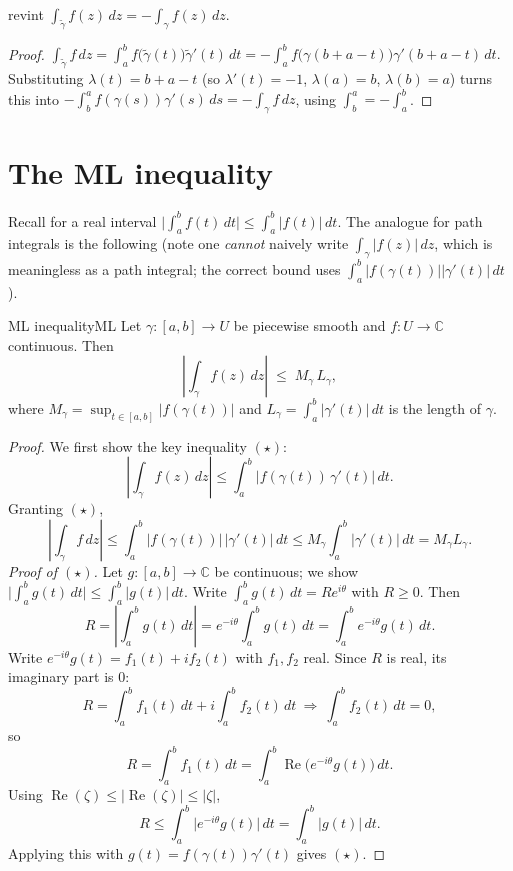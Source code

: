 \documentclass[11pt,openany]{report}
\newcommand{\C}{\mathbb{C}}
\renewcommand{\Re}{\operatorname{Re}}
\newcommand{\abs}[1]{\left\lvert #1 \right\rvert}
\begin{document}
\begin{propos}{}{revint}
$\displaystyle\int_{\widetilde\gamma}f(z)\,dz = -\int_{\gamma}f(z)\,dz.$
\end{propos}

\begin{proof}
$\displaystyle\int_{\widetilde\gamma}f\,dz=\int_a^b f\bigl(\widetilde\gamma(t)\bigr)\widetilde\gamma'(t)\,dt
=-\int_a^b f\bigl(\gamma(b+a-t)\bigr)\gamma'(b+a-t)\,dt.$ Substituting
$\lambda(t)=b+a-t$ (so $\lambda'(t)=-1$, $\lambda(a)=b$, $\lambda(b)=a$) turns this into
$-\int_b^a f(\gamma(s))\gamma'(s)\,ds=-\int_\gamma f\,dz$, using $\int_b^a=-\int_a^b$.
\end{proof}

\section{The ML inequality}

Recall for a real interval $\bigl\lvert\int_a^b f(t)\,dt\bigr\rvert\le\int_a^b\abs{f(t)}\,dt$.
The analogue for path integrals is the following (note one \emph{cannot} naively write
$\int_\gamma\abs{f(z)}\,dz$, which is meaningless as a path integral; the correct bound
uses $\int_a^b\abs{f(\gamma(t))}\abs{\gamma'(t)}\,dt$).

\begin{theorem}{ML inequality}{ML}
Let $\gamma:[a,b]\to U$ be piecewise smooth and $f:U\to\C$ continuous. Then
\[
  \boxed{\ \left\lvert \int_\gamma f(z)\,dz \right\rvert \;\le\; M_\gamma\, L_\gamma,\ }
\]
where $M_\gamma=\sup_{t\in[a,b]}\abs{f(\gamma(t))}$ and
$L_\gamma=\int_a^b\abs{\gamma'(t)}\,dt$ is the length of $\gamma$.
\end{theorem}

\begin{proof}
We first show the key inequality $(\star)$:
\[
  \left\lvert\int_\gamma f(z)\,dz\right\rvert \le \int_a^b \bigl\lvert f(\gamma(t))\,\gamma'(t)\bigr\rvert\,dt. \tag{$\star$}
\]
Granting $(\star)$,
\[
  \left\lvert\int_\gamma f\,dz\right\rvert \le \int_a^b\abs{f(\gamma(t))}\,\abs{\gamma'(t)}\,dt
  \le M_\gamma\int_a^b\abs{\gamma'(t)}\,dt = M_\gamma L_\gamma .
\]
\emph{Proof of $(\star)$.} Let $g:[a,b]\to\C$ be continuous; we show
$\bigl\lvert\int_a^b g(t)\,dt\bigr\rvert\le\int_a^b\abs{g(t)}\,dt$. Write
$\int_a^b g(t)\,dt=R e^{i\theta}$ with $R\ge0$. Then
\[
  R = \left\lvert\int_a^b g(t)\,dt\right\rvert = e^{-i\theta}\int_a^b g(t)\,dt = \int_a^b e^{-i\theta}g(t)\,dt .
\]
Write $e^{-i\theta}g(t)=f_1(t)+i f_2(t)$ with $f_1,f_2$ real. Since $R$ is real, its
imaginary part is $0$:
\[
  R = \int_a^b f_1(t)\,dt + i\int_a^b f_2(t)\,dt \ \Longrightarrow\ \int_a^b f_2(t)\,dt=0,
\]
so
\[
  R = \int_a^b f_1(t)\,dt = \int_a^b \Re\bigl(e^{-i\theta}g(t)\bigr)\,dt .
\]
Using $\Re(\zeta)\le\abs{\Re(\zeta)}\le\abs{\zeta}$,
\[
  R \le \int_a^b \bigl\lvert e^{-i\theta}g(t)\bigr\rvert\,dt = \int_a^b\abs{g(t)}\,dt .
\]
Applying this with $g(t)=f(\gamma(t))\gamma'(t)$ gives $(\star)$.
\end{proof}
\end{document}
